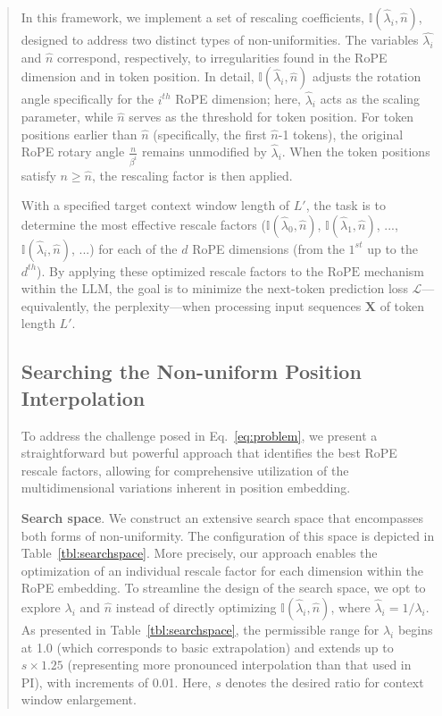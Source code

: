 \begin{abstract}
In this framework, we implement a set of rescaling coefficients, $\mathbb{I}(\hat{\lambda}_{i},\hat{n})$, designed to address two distinct types of non-uniformities. The variables $\hat{\lambda_i}$ and $\hat{n}$ correspond, respectively, to irregularities found in the RoPE dimension and in token position. In detail, $\mathbb{I}(\hat{\lambda}_{i},\hat{n})$ adjusts the rotation angle specifically for the $i^{th}$ RoPE dimension; here, $\hat\lambda_{i}$ acts as the scaling parameter, while $\hat{n}$ serves as the threshold for token position. For token positions earlier than $\hat{n}$ (specifically, the first $\hat{n}$-1 tokens), the original RoPE rotary angle $\frac{n}{\beta^i}$ remains unmodified by $\hat\lambda_{i}$. When the token positions satisfy $n \ge \hat{n}$, the rescaling factor is then applied.

With a specified target context window length of $L'$, the task is to determine the most effective rescale factors ($\mathbb{I}(\hat{\lambda}_{0},\hat{n})$, $\mathbb{I}(\hat{\lambda}_{1},\hat{n})$, ..., $\mathbb{I}(\hat{\lambda}_{i},\hat{n})$, ...) for each of the $d$ RoPE dimensions (from the $1^{st}$ up to the $d^{th}$). By applying these optimized rescale factors to the $\text{RoPE}$ mechanism within the $\text{LLM}$, the goal is to minimize the next-token prediction loss $\mathcal{L}$—equivalently, the perplexity—when processing input sequences $\mathbf{X}$ of token length $L'$.

\subsection{Searching the Non-uniform Position Interpolation}

To address the challenge posed in Eq.~\ref{eq:problem}, we present a straightforward but powerful approach that identifies the best RoPE rescale factors, allowing for comprehensive utilization of the multidimensional variations inherent in position embedding.

\textbf{Search space}. We construct an extensive search space that encompasses both forms of non-uniformity. The configuration of this space is depicted in Table~\ref{tbl:searchspace}. More precisely, our approach enables the optimization of an individual rescale factor for each dimension within the RoPE embedding. To streamline the design of the search space, we opt to explore $\lambda_i$ and $\hat{n}$ instead of directly optimizing $\mathbb{I}(\hat{\lambda}_{i},\hat{n})$, where  $\hat{\lambda}_{i}=1/\lambda_i$. As presented in Table~\ref{tbl:searchspace}, the permissible range for $\lambda_i$ begins at 1.0 (which corresponds to basic extrapolation) and extends up to $s\times1.25$ (representing more pronounced interpolation than that used in PI), with increments of 0.01. Here, $s$ denotes the desired ratio for context window enlargement.


\end{abstract}
